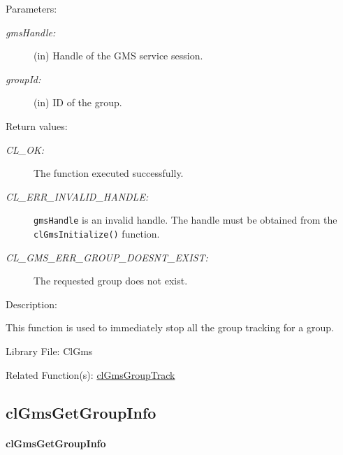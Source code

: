\begin{flushleft}
\begin{Desc}
\item[Parameters:]
\begin{description}
  \item[{\em gmsHandle:}]
 (in) Handle of the GMS service session.
  \item[{\em  groupId: }](in) ID of the group.
\end{description}
\end{Desc}

\begin{Desc}
\item[Return values:]
\begin{description}
\item[{\em CL\_\-OK:}]The function executed successfully.
\item[{\em CL\_\-ERR\_\-INVALID\_\-HANDLE:}] {\tt{gmsHandle}} is an invalid handle. The handle must be obtained from the
{\tt{clGmsInitialize()}} function. 
 \item[{\em CL\_\-GMS\_\-ERR\_\-GROUP\_\-DOESNT\_\-EXIST:}] The requested group does not exist.
 \end{description}
  \end{Desc}


\begin{Desc}
\item[Description:]

  This function is used to immediately stop all the group tracking for a group.
\end{Desc}


 \begin{Desc}
\item[Library File:]Cl\-Gms\end{Desc}
\begin{Desc}
  \item[Related Function(s):] \hyperlink{pagegms107}{clGmsGroupTrack}
  \end{Desc}



\newpage
\subsection{clGmsGetGroupInfo}
\hypertarget{pagegms109}{}\paragraph{cl\-Gms\-Get\-Group\-Info}\label{pagegms109}



\end{flushleft}
